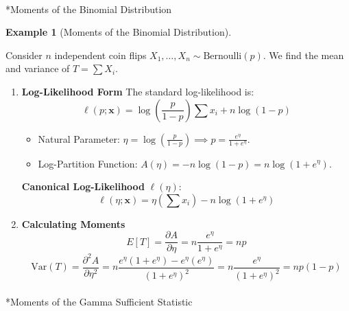 \documentclass[
  letterpaper,
  DIV=11,
  numbers=noendperiod]{scrreprt}
\makeatletter
\let\oldparagraph\paragraph
\renewcommand{\paragraph}{
    \@ifstar
      \xxxParagraphStar
      \xxxParagraphNoStar
  }
\newcommand{\xxxParagraphStar}[1]{\oldparagraph*{#1}\mbox{}}
\newcommand{\xxxParagraphNoStar}[1]{\oldparagraph{#1}\mbox{}}
\providecommand{\tightlist}{%
  \setlength{\itemsep}{0pt}\setlength{\parskip}{0pt}}
\renewcommand{\[}{\begin{equation}}
\renewcommand{\]}{\end{equation}}
\theoremstyle{definition}
\theoremstyle{plain}
\theoremstyle{plain}
\theoremstyle{plain}
\theoremstyle{definition}
\newtheorem{example}{Example}[chapter]
\theoremstyle{plain}
\theoremstyle{remark}
\makeatother
\begin{document}
\paragraph*{Moments of the Binomial
Distribution}\label{moments-of-the-binomial-distribution}

\begin{example}[Moments of the Binomial
Distribution]\protect\hypertarget{exm-bernoulli-moments}{}\label{exm-bernoulli-moments}

Consider \(n\) independent coin flips
\(X_1, \dots, X_n \sim \text{Bernoulli}(p)\). We find the mean and
variance of \(T = \sum X_i\).

\begin{enumerate}
\def\labelenumi{\arabic{enumi}.}
\item
  \textbf{Log-Likelihood Form} The standard log-likelihood is: \[
   \ell(p; \mathbf{x}) = \log\left(\frac{p}{1-p}\right) \sum x_i + n \log(1-p)
   \]

  \begin{itemize}
  \tightlist
  \item
    Natural Parameter:
    \(\eta = \log\left(\frac{p}{1-p}\right) \implies p = \frac{e^\eta}{1+e^\eta}\).
  \item
    Log-Partition Function:
    \(A(\eta) = -n \log(1-p) = n \log(1+e^\eta)\).
  \end{itemize}

  \textbf{Canonical Log-Likelihood} \(\ell(\eta)\): \[
   \ell(\eta; \mathbf{x}) = \eta \left(\sum x_i\right) - n \log(1+e^\eta)
   \]
\item
  \textbf{Calculating Moments} \[
   E[T] = \frac{\partial A}{\partial \eta} = n \frac{e^\eta}{1+e^\eta} = np
   \] \[
   \text{Var}(T) = \frac{\partial^2 A}{\partial \eta^2} = n \frac{e^\eta (1+e^\eta) - e^\eta(e^\eta)}{(1+e^\eta)^2} = n \frac{e^\eta}{(1+e^\eta)^2} = np(1-p)
   \]
\end{enumerate}

\end{example}

\paragraph*{Moments of the Gamma Sufficient
Statistic}\label{moments-of-the-gamma-sufficient-statistic}
\end{document}
